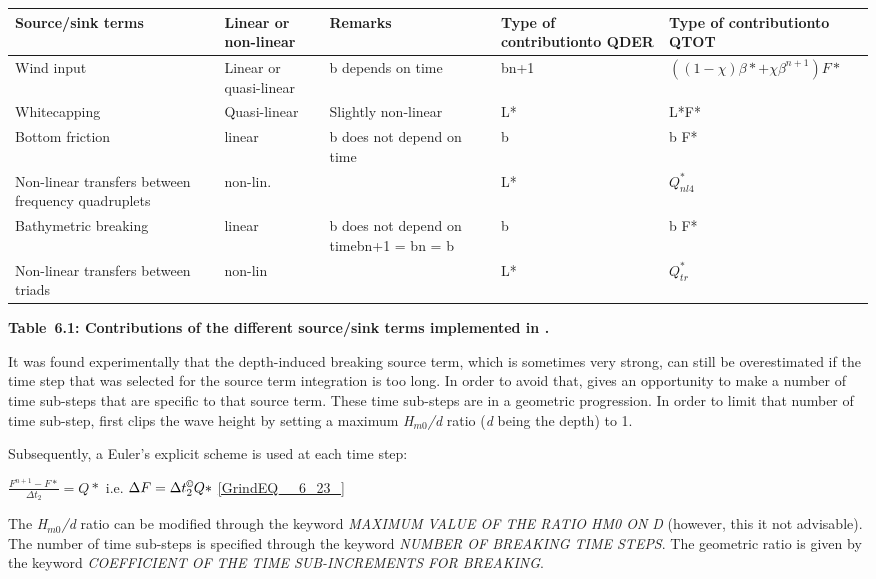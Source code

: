  

\begin{tabular}{|p{0.9in}|p{0.5in}|p{1.0in}|p{1.0in}|p{1.1in}|} \hline
Source/sink terms & Linear or non-linear & Remarks & Type of contributionto QDER & Type of contributionto QTOT \\ \hline
Wind input\newline  & Linear or quasi-linear & b depends on time & bn+1 & $\left((1-\chi )\beta *+\chi \beta ^{n+1} \right)F*$ \\ \hline
Whitecapping & Quasi-linear & Slightly non-linear & L* & L*F* \\ \hline
Bottom friction & linear & b does not depend on time & b & b F* \\ \hline
Non-linear transfers between frequency quadruplets & non-lin. &  & L* & $Q_{nl4}^{*} $ \\ \hline
Bathymetric breaking & linear & b does not depend on time\newline bn+1 = bn = b & b & b F* \\ \hline
Non-linear transfers between triads & non-lin &  & L* & $Q_{tr}^{*} $ \\ \hline
\end{tabular}

\textbf{Table~6.1: Contributions of the different source/sink terms implemented in \tomawac.}

 It was found experimentally that the depth-induced breaking source term, which is sometimes very strong, can still be overestimated if the time step that was selected for the source term integration is too long. In order to avoid that, \tomawac gives an opportunity to make a number of time sub-steps that are specific to that source term. These time sub-steps are in a geometric progression. In order to limit that number of time sub-step, \tomawac first clips the wave height by setting a maximum \textit{H${}_{m0}$/d} ratio (\textit{d} being the depth) to 1.

 Subsequently, a Euler's explicit scheme is used at each time step:

$\frac{F^{n+1} -F*}{\Delta t_{2} } =Q*$  i.e.  $\Delta F=\Delta t_{2}^{\copyright } Q*$ \eqref{GrindEQ__6_23_}

 The \textit{H${}_{m0}$/d} ratio can be modified through the keyword \textit{MAXIMUM VALUE OF THE RATIO HM0 ON D} (however, this it not advisable). The number of time sub-steps is specified through the keyword \textit{NUMBER OF BREAKING TIME STEPS}. The geometric ratio is given by the keyword \textit{COEFFICIENT OF THE TIME SUB-INCREMENTS FOR BREAKING}.


